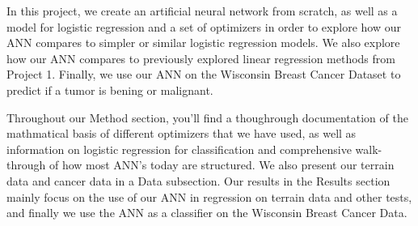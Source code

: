 In this project, we create an artificial neural network from scratch, as well as a model for logistic regression and a set of optimizers 
in order to explore how our ANN compares to simpler or similar logistic regression models. We also explore how our ANN compares to previously 
explored linear regression methods from Project 1. Finally, we use our ANN on the Wisconsin Breast Cancer Dataset to predict if a
tumor is bening or malignant. 

Throughout our Method section, you'll find a thoughrough documentation of the mathmatical basis of different optimizers
that we have used, as well as information on logistic regression for classification and comprehensive walk-through of how most ANN's today are structured.
We also present our terrain data and cancer data in a Data subsection. Our results in the Results section mainly focus on the use of our ANN 
in regression on terrain data and other tests, and finally we use the ANN as a classifier on the Wisconsin Breast Cancer Data. 




